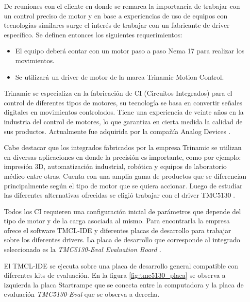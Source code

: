 De reuniones con el cliente en donde se remarca la importancia de trabajar con un control preciso de motor y en base a experiencias de uso de equipos con tecnologías similares surge el interés de trabajar con un fabricante de driver específico. Se definen entonces los siguientes requerimientos:
			
\begin{itemize}
\item El equipo deberá contar con un motor paso a paso Nema 17 \citep{web_nema17}  para realizar los movimientos.
\item Se utilizará un driver de motor de la marca Trinamic Motion Control.
\end{itemize}

Trinamic \citep{3_web_trinamic} se especializa en la fabricación de CI (Circuitos Integrados) para el control de diferentes tipos de motores, su tecnología se basa en convertir señales digitales en movimientos controlados. Tiene una experiencia de veinte años en la industria del control de motores, lo que garantiza en cierta medida la calidad de sus productos. Actualmente fue adquirida por la compañía Analog Devices \citep{web_analogdevices}.

Cabe destacar que los integrados fabricados por la empresa Trinamic se utilizan en diversas aplicaciones en donde la precisión es importante, como por ejemplo: impresión 3D, automatización industrial, robótica y equipos de laboratorio médico entre otras.
Cuenta con una amplia gama de productos que se diferencian principalmente según el tipo de motor que se quiera accionar. Luego de estudiar las diferentes alternativas ofrecidas se eligió trabajar con el driver TMC5130 \citep{3_web_trinamic_producto}.
  
Todos los CI requieren una configuración inicial de parámetros que depende del tipo de motor y de la carga asociada al mismo. Para encontrarla la empresa ofrece el software TMCL-IDE y diferentes placas de desarrollo para trabajar sobre los diferentes drivers. La placa de desarrollo que corresponde al integrado seleccionado es la \textit{TMC5130-Eval Evaluation Board} \citep{3_web_trinamic_placa}.

El TMCL-IDE se ejecuta sobre una placa de desarrollo general compatible con diferentes kits de evaluación. En la figura \ref{fig:tmc5130_placa} se observa a izquierda la placa Startrampe  que se conecta entre la computadora y la placa de evaluación \textit{TMC5130-Eval} que se observa a derecha. 

